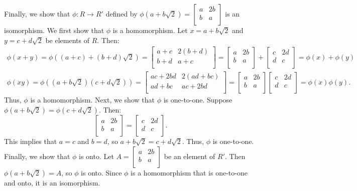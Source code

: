 \begin{solution}
  Finally, we show that $\phi : R \to R'$ defined by $\phi(a + b\sqrt{2}) = \begin{bmatrix}
    a & 2b \\
    b & a \\
  \end{bmatrix}$ is an isomorphism. We first show that $\phi$ is a homomorphism. Let $x = a + b\sqrt{2}$ and $y = c + d\sqrt{2}$ be elements of $R$. Then:
  \begin{gather*}
    \phi(x + y) = \phi((a + c) + (b + d)\sqrt{2}) = \begin{bmatrix}
      a + c & 2(b + d) \\
      b + d & a + c \\
    \end{bmatrix} = \begin{bmatrix}
      a & 2b \\
      b & a \\
    \end{bmatrix} + \begin{bmatrix}
      c & 2d \\
      d & c \\
    \end{bmatrix} = \phi(x) + \phi(y) \\
    \phi(xy) = \phi((a + b\sqrt{2})(c + d\sqrt{2})) = \begin{bmatrix}
      ac + 2bd & 2(ad + bc) \\
      ad + bc & ac + 2bd \\
    \end{bmatrix}
    = \begin{bmatrix}
      a & 2b \\
      b & a \\
      \end{bmatrix} \begin{bmatrix}
      c & 2d \\
      d & c \\
    \end{bmatrix} = \phi(x)\phi(y)
  .\end{gather*}
  Thus, $\phi$ is a homomorphism. Next, we show that $\phi$ is one-to-one. Suppose $\phi(a + b\sqrt{2}) = \phi(c + d\sqrt{2})$. Then:
  \[%
    \begin{bmatrix}
      a & 2b \\
      b & a \\
    \end{bmatrix} = \begin{bmatrix}
      c & 2d \\
      d & c \\
    \end{bmatrix}
  .\]%
  This implies that $a = c$ and $b = d$, so $a + b\sqrt{2} = c + d\sqrt{2}$. Thus, $\phi$ is one-to-one. Finally, we show that $\phi$ is onto. Let $A = \begin{bmatrix}
    a & 2b \\
    b & a \\
  \end{bmatrix}$ be an element of $R'$. Then $\phi(a + b\sqrt{2}) = A$, so $\phi$ is onto. Since $\phi$ is a homomorphism that is one-to-one and onto, it is an isomorphism.
\end{solution}


